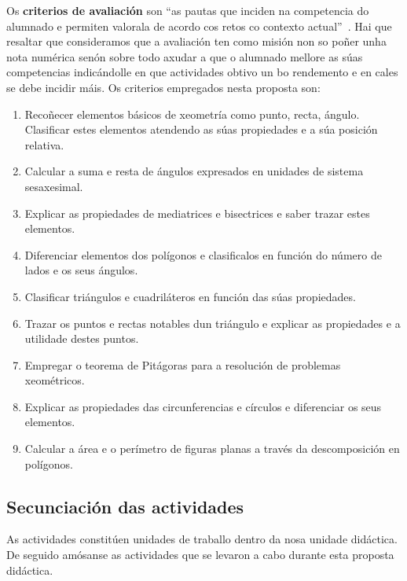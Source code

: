 Os \textbf{criterios de avaliación} son ``as pautas que inciden na competencia do alumnado e permiten valorala de acordo cos retos co contexto actual''~\cite[p. 134]{secdidac}. Hai que resaltar que consideramos que a avaliación ten como misión non so poñer unha nota numérica senón sobre todo axudar a que o alumnado mellore as súas competencias indicándolle en que actividades obtivo un bo rendemento e en cales se debe incidir máis. Os criterios empregados nesta proposta son:

\begin{enumerate}[label=\bfseries Cri\arabic*]
  \item\label{cri1} Recoñecer elementos básicos de xeometría como punto, recta, ángulo. Clasificar estes elementos atendendo as súas propiedades e a súa posición relativa.
  \item\label{cri2} Calcular a suma e resta de ángulos expresados en unidades de sistema sesaxesimal.
  \item\label{cri3} Explicar as propiedades de mediatrices e bisectrices e saber trazar estes elementos.
  \item\label{cri4} Diferenciar elementos dos polígonos e clasificalos en función do número de lados e os seus ángulos.
  \item\label{cri5} Clasificar triángulos e cuadriláteros en función das súas propiedades.
  \item\label{cri6} Trazar os puntos e rectas notables dun triángulo e explicar as propiedades e a utilidade destes puntos.
  \item\label{cri7} Empregar o teorema de Pitágoras para a resolución de problemas xeométricos.
  \item\label{cri8} Explicar as propiedades das circunferencias e círculos e diferenciar os seus elementos.
  \item\label{cri9} Calcular a área e o perímetro de figuras planas a través da descomposición en polígonos.
\end{enumerate}


\subsection{Secunciación das actividades}

As actividades constitúen unidades de traballo dentro da nosa unidade didáctica. De seguido amósanse as actividades que se levaron a cabo durante esta proposta didáctica.

